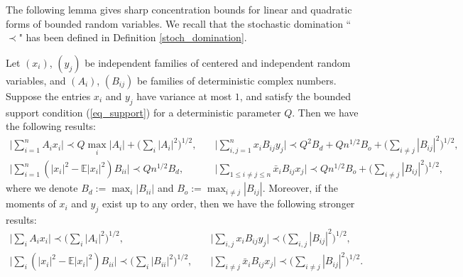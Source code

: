 The following lemma gives sharp concentration bounds for linear and quadratic forms of bounded random variables. We recall that the stochastic domination ``$\prec$" has been defined in Definition \ref{stoch_domination}.
\begin{lemma}\label{largedeviation}
Let $(x_i)$, $(y_j)$ be independent families of centered and independent random variables, and $(A_i)$, $(B_{ij})$ be families of deterministic complex numbers. Suppose the entries $x_i$ and $y_j$ have variance at most $1$, and satisfy the bounded support condition (\ref{eq_support}) for a deterministic parameter $Q$. %
Then we have the following results:
\begin{align}
\Big| \sum_{i=1}^n A_i x_i \Big\vert \prec Q \max_{i} \vert A_i \vert+ \Big(\sum_i |A_i|^2 \Big)^{1/2} , \quad &\Big\vert  \sum_{i,j=1}^n x_i B_{ij} y_j \Big\vert \prec Q^2 B_d  + Q n^{1/2}B_o +  \Big(\sum_{i\ne j} |B_{ij}|^2\Big)^{{1}/{2}},\label{eq largedev10}  \\
\Big\vert  \sum_{i=1}^n (|x_i|^2-\mathbb E|x_i|^2) B_{ii}  \Big\vert  \prec Q n^{1/2}B_d   , \quad &\Big\vert  \sum_{1\le i\ne j\le n} \bar x_i B_{ij} x_j \Big\vert  \prec Qn^{1/2}B_o +  \Big(\sum_{i\ne j} |B_{ij}|^2\Big)^{{1}/{2}} ,\label{eq largedev20}
\end{align}
where we denote $B_d:=\max_{i} |B_{ii} |$ and $B_o:= \max_{i\ne j} |B_{ij}|.$ Moreover, if the moments of $ x_i$ and $ y_j$ exist up to any order, then we have the following stronger results:
\begin{align}
\Big\vert \sum_i A_i x_i \Big\vert \prec  \Big(\sum_i |A_i|^2 \Big)^{1/2} , \quad  & \Big\vert \sum_{i,j} x_i B_{ij} y_j \Big\vert \prec  \Big(\sum_{i, j} |B_{ij}|^2\Big)^{{1}/{2}}, \label{eq largedev1} \\
 \Big\vert  \sum_{i} (|x_i|^2-\mathbb E|x_i|^2) B_{ii}  \Big\vert  \prec  \Big( \sum_i |B_{ii} |^2\Big)^{1/2}  ,\quad & \Big\vert  \sum_{i\ne j} \bar x_i B_{ij} x_j \Big\vert  \prec \Big(\sum_{i\ne j} |B_{ij}|^2\Big)^{{1}/{2}}.\label{eq largedev2}
\end{align}
\end{lemma}
